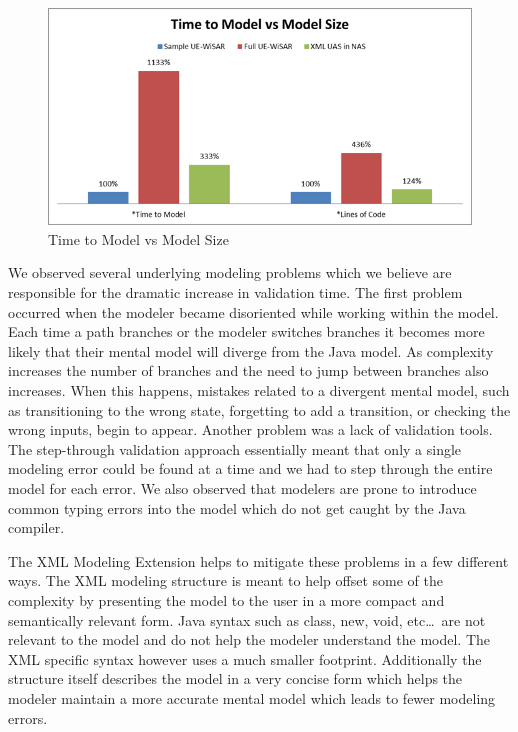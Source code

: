 \begin{figure}[h]
\begin{center}
\includegraphics[width=5in]{time_to_model.png}
\caption{Time to Model vs Model Size}
\label{fig:time_to_model}
\end{center}
\end{figure}

We observed several underlying modeling problems which we believe are responsible for the dramatic increase in validation time.  The first problem occurred when the modeler became disoriented while working within the model.  Each time a path branches or the modeler switches branches it becomes more likely that their mental model will diverge from the Java model.  As complexity increases the number of branches and the need to jump between branches also increases.  When this happens, mistakes related to a divergent mental model, such as transitioning to the wrong state, forgetting to add a transition, or checking the wrong inputs, begin to appear.  Another problem was a lack of validation tools.  The step-through validation approach essentially meant that only a single modeling error could be found at a time and we had to step through the entire model for each error.  We also observed that modelers are prone to introduce common typing errors into the model which do not get caught by the Java compiler.  

The XML Modeling Extension helps to mitigate these problems in a few different ways.  The XML modeling structure is meant to help offset some of the complexity by presenting the model to the user in a more compact and semantically relevant form.  Java syntax such as class, new, void, etc\ldots~are not relevant to the model and do not help the modeler understand the model.  The XML specific syntax however uses a much smaller footprint.  Additionally the structure itself describes the model in a very concise form which helps the modeler maintain a more accurate mental model which leads to fewer modeling errors.

